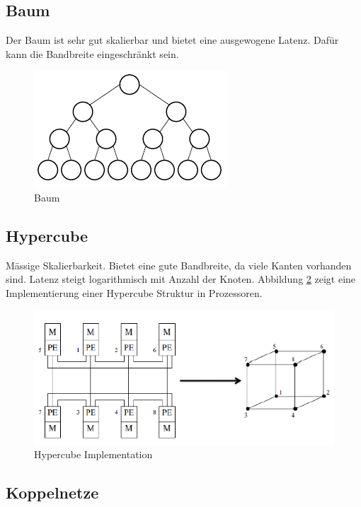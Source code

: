 \newpage

\subsection{Baum}
Der Baum ist sehr gut skalierbar und bietet eine ausgewogene Latenz. Dafür kann die Bandbreite eingeschränkt sein.

\begin{figure}[h!]
	\centering
	\includegraphics[width=0.2\linewidth]{fig/baum}
	\caption{Baum}
	\label{fig:baum}
\end{figure}

\subsection{Hypercube}
Mässige Skalierbarkeit. Bietet eine gute Bandbreite, da viele Kanten vorhanden sind. Latenz steigt logarithmisch mit Anzahl der Knoten. Abbildung \ref{fig:hypercube_impl} zeigt eine Implementierung einer Hypercube Struktur in Prozessoren.

\begin{figure}[h!]
\centering
\includegraphics[width=0.5\linewidth]{fig/hypercube_impl}
\caption{Hypercube Implementation}
\label{fig:hypercube_impl}
\end{figure}

\subsection{Koppelnetze}


